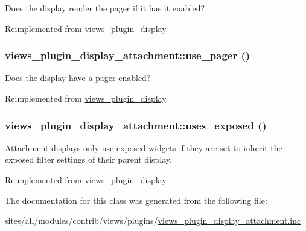 Does the display render the pager if it has it enabled? 

Reimplemented from \hyperlink{classviews__plugin__display_0594f29620ea589280dee099666623c3}{views\_\-plugin\_\-display}.\hypertarget{classviews__plugin__display__attachment_0a08a465f715c107a2dfaf9bd5dd1538}{
\subsubsection[{use\_\-pager}]{\setlength{\rightskip}{0pt plus 5cm}views\_\-plugin\_\-display\_\-attachment::use\_\-pager ()}}
\label{classviews__plugin__display__attachment_0a08a465f715c107a2dfaf9bd5dd1538}


Does the display have a pager enabled? 

Reimplemented from \hyperlink{classviews__plugin__display_aae358d9672426a81a1733a0236019b8}{views\_\-plugin\_\-display}.\hypertarget{classviews__plugin__display__attachment_f62963a58736c80a5750c87588fb093a}{
\subsubsection[{uses\_\-exposed}]{\setlength{\rightskip}{0pt plus 5cm}views\_\-plugin\_\-display\_\-attachment::uses\_\-exposed ()}}
\label{classviews__plugin__display__attachment_f62963a58736c80a5750c87588fb093a}


Attachment displays only use exposed widgets if they are set to inherit the exposed filter settings of their parent display. 

Reimplemented from \hyperlink{classviews__plugin__display_5bfcb22187618f52bea9ea626aff18a4}{views\_\-plugin\_\-display}.

The documentation for this class was generated from the following file:\begin{CompactItemize}
\item 
sites/all/modules/contrib/views/plugins/\hyperlink{views__plugin__display__attachment_8inc}{views\_\-plugin\_\-display\_\-attachment.inc}\end{CompactItemize}
